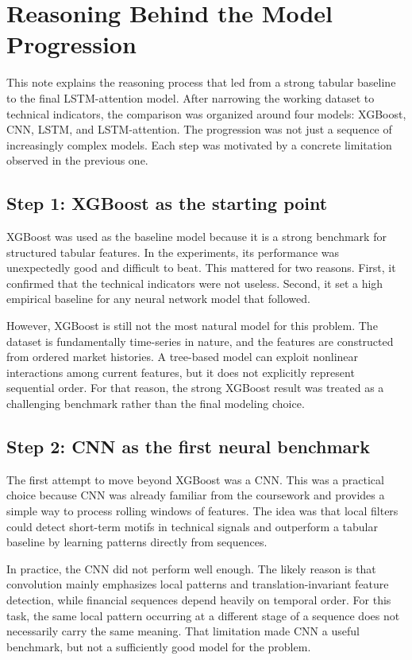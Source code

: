 \section{Reasoning Behind the Model Progression}

This note explains the reasoning process that led from a strong tabular baseline to the final LSTM-attention model. After narrowing the working dataset to technical indicators, the comparison was organized around four models: XGBoost, CNN, LSTM, and LSTM-attention. The progression was not just a sequence of increasingly complex models. Each step was motivated by a concrete limitation observed in the previous one.

\subsection{Step 1: XGBoost as the starting point}

XGBoost was used as the baseline model because it is a strong benchmark for structured tabular features. In the experiments, its performance was unexpectedly good and difficult to beat. This mattered for two reasons. First, it confirmed that the technical indicators were not useless. Second, it set a high empirical baseline for any neural network model that followed.

However, XGBoost is still not the most natural model for this problem. The dataset is fundamentally time-series in nature, and the features are constructed from ordered market histories. A tree-based model can exploit nonlinear interactions among current features, but it does not explicitly represent sequential order. For that reason, the strong XGBoost result was treated as a challenging benchmark rather than the final modeling choice.

\subsection{Step 2: CNN as the first neural benchmark}

The first attempt to move beyond XGBoost was a CNN. This was a practical choice because CNN was already familiar from the coursework and provides a simple way to process rolling windows of features. The idea was that local filters could detect short-term motifs in technical signals and outperform a tabular baseline by learning patterns directly from sequences.

In practice, the CNN did not perform well enough. The likely reason is that convolution mainly emphasizes local patterns and translation-invariant feature detection, while financial sequences depend heavily on temporal order. For this task, the same local pattern occurring at a different stage of a sequence does not necessarily carry the same meaning. That limitation made CNN a useful benchmark, but not a sufficiently good model for the problem.

